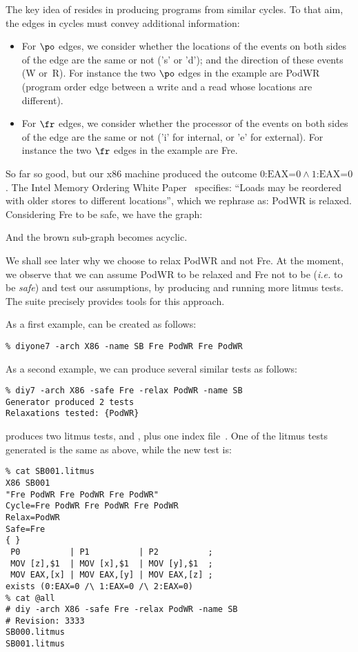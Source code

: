 The key idea of \diy{} resides in producing programs from similar
cycles. To that aim, the edges in cycles must convey additional
information:
\begin{itemize}
\item For $\po$ edges, we consider whether the locations
of the events on both sides of the edge are the same or not
('s' or 'd'); and the direction of these events (W or~R).
For instance the two $\po$ edges in the example are PodWR
(program order edge between a write and a read whose locations are
different).
\item For $\fr$ edges, we consider whether the processor
of the events on both sides of the edge are the same or not
('i' for internal, or 'e' for external).
For instance the two $\fr$ edges in the example are Fre.
\end{itemize}

So far so good, but our x86 machine produced the outcome
\(\mbox{0:EAX} \mathord{=} \mbox{0} \wedge
\mbox{1:EAX} \mathord{=} \mbox{0}\).
The Intel Memory Ordering White Paper~\cite{intel:white}
specifies: ``Loads may be reordered with older stores to different locations'',
which we rephrase as: PodWR is relaxed.
Considering Fre to be safe, we have the graph:
\begin{center}
\end{center}
And the brown sub-graph becomes acyclic.

We shall see later why we choose to relax PodWR and not Fre.
At the moment, we observe that we can assume PodWR to be relaxed
and Fre not to be (\emph{i.e.} to be \emph{safe}) and test
our assumptions, by producing and running more litmus tests.
The \diy{} suite precisely provides tools for this approach.

\label{diyone:intro}As a first example,
can be created as follows:
\begin{verbatim}
% diyone7 -arch X86 -name SB Fre PodWR Fre PodWR
\end{verbatim}

As a second example, we can produce several similar tests
as follows:
\begin{verbatim}
% diy7 -arch X86 -safe Fre -relax PodWR -name SB
Generator produced 2 tests
Relaxations tested: {PodWR}
\end{verbatim}
\diy{} produces two litmus tests, 
and , plus one index file~.
One of the litmus tests generated is the same as above, while
the new test is:
\begin{verbatim}
% cat SB001.litmus
X86 SB001
"Fre PodWR Fre PodWR Fre PodWR"
Cycle=Fre PodWR Fre PodWR Fre PodWR
Relax=PodWR
Safe=Fre
{ }
 P0          | P1          | P2          ;
 MOV [z],$1  | MOV [x],$1  | MOV [y],$1  ;
 MOV EAX,[x] | MOV EAX,[y] | MOV EAX,[z] ;
exists (0:EAX=0 /\ 1:EAX=0 /\ 2:EAX=0)
% cat @all
# diy -arch X86 -safe Fre -relax PodWR -name SB
# Revision: 3333
SB000.litmus
SB001.litmus
\end{verbatim}

